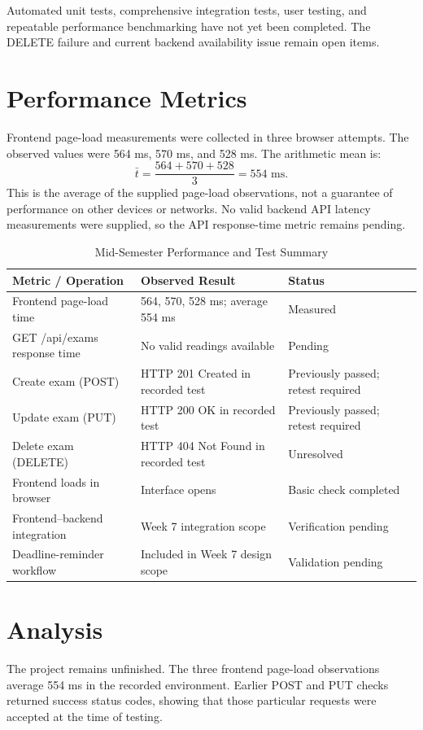 \documentclass[12pt,a4paper]{report}
\begin{document}
Automated unit tests, comprehensive integration tests, user testing, and repeatable performance benchmarking have not yet been completed. The DELETE failure and current backend availability issue remain open items.

\section{Performance Metrics}
Frontend page-load measurements were collected in three browser attempts. The observed values were 564 ms, 570 ms, and 528 ms. The arithmetic mean is:
\[
\bar{t}=\frac{564+570+528}{3}=554\text{ ms}.
\]
This is the average of the supplied page-load observations, not a guarantee of performance on other devices or networks. No valid backend API latency measurements were supplied, so the API response-time metric remains pending.

\begin{table}[htbp]
\centering
\caption{Mid-Semester Performance and Test Summary}
\label{tab:metrics}
\begin{tabular}{p{} p{} p{}}
\toprule
\textbf{Metric / Operation} & \textbf{Observed Result} & \textbf{Status}\\
\midrule
Frontend page-load time & 564, 570, 528 ms; average 554 ms & Measured\\
GET /api/exams response time & No valid readings available & Pending\\
Create exam (POST) & HTTP 201 Created in recorded test & Previously passed; retest required\\
Update exam (PUT) & HTTP 200 OK in recorded test & Previously passed; retest required\\
Delete exam (DELETE) & HTTP 404 Not Found in recorded test & Unresolved\\
Frontend loads in browser & Interface opens & Basic check completed\\
Frontend--backend integration & Week 7 integration scope & Verification pending\\
Deadline-reminder workflow & Included in Week 7 design scope & Validation pending\\
\bottomrule
\end{tabular}
\end{table}

\section{Analysis}
The project remains unfinished. The three frontend page-load observations average 554 ms in the recorded environment. Earlier POST and PUT checks returned success status codes, showing that those particular requests were accepted at the time of testing.
\end{document}
